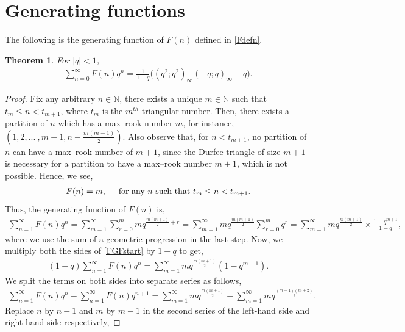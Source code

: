 \documentclass[12pt,reqno]{amsart}
\numberwithin{equation}{section}
\theoremstyle{plain}
\newtheorem{theorem}{Theorem}[section]
\begin{document}
	\section{Generating functions}\label{SectionGF}
	The following is the generating function of $F(n)$ defined in \eqref{Fdefn}.
	\begin{theorem}\label{FGF}
		For $|q|<1$,
		\begin{align}
			\sum_{n=0}^{\infty} F(n) q^n = \frac{1}{1-q}\big( (q^2;q^2)_{\infty} (-q;q)_{\infty} -q \big).
		\end{align}
	\end{theorem}
	\begin{proof}
	Fix any arbitrary $n \in \mathbb{N}$, there exists a unique $m \in \mathbb{N}$ such that $t_m \leq n <t_{m+1}$, where $t_m$ is the $m^{th}$ triangular number. Then, there exists a partition of $n$ which has a max--rook number $m$, for instance, $\left(1,2, ...\ , m-1,  n -\frac{m(m-1)}{2}\right)$. Also observe that, for $n<t_{m+1}$, no partition of $n$ can have a max--rook number of $m+1$, since the Durfee triangle of size $m+1$ is necessary for a partition to have a max--rook number $m+1$, which is not possible. Hence, we see,
	\begin{align*}
		F(n) = m, \hspace{0.5 cm} \textup{for any $n$ such that } t_m \leq n <t_{m+1}.
	\end{align*} 
	Thus, the generating function of $F(n)$ is,
	\begin{align}
		\sum_{n=1}^{\infty} F(n) q^n = \sum_{m=1}^{\infty} \sum_{r=0}^{m} m q^{\frac{m(m+1)}{2}+r} = \sum_{m=1}^{\infty} m q^{\frac{m(m+1)}{2}} \sum_{r=0}^{m} q^r = \sum_{m=1}^{\infty} m q^{\frac{m(m+1)}{2}} \times \frac{1-q^{m+1}}{1-q}, \label{FGFstart}
	\end{align}
	where we use the sum of a geometric progression in the last step. Now, we multiply both the sides of \eqref{FGFstart} by $1-q$ to get,
	\begin{align}
		(1-q) \sum_{n=1}^{\infty} F(n) q^n =  \sum_{m=1}^{\infty} m q^{\frac{m(m+1)}{2}} (1-q^{m+1}). \label{Fst1}
	\end{align} 
	We split the terms on both sides into separate series as follows,
	\begin{align*}
		\sum_{n=1}^{\infty} F(n) q^n - \sum_{n=1}^{\infty} F(n) q^{n+1} = \sum_{m=1}^{\infty} m q^{\frac{m(m+1)}{2}} - \sum_{m=1}^{\infty} m q^{\frac{(m+1)(m+2)}{2}}.
	\end{align*}
	Replace $n$ by $n-1$ and $m$ by $m-1$ in the second series of the left-hand side and right-hand side respectively,

\end{proof}
\end{document}
